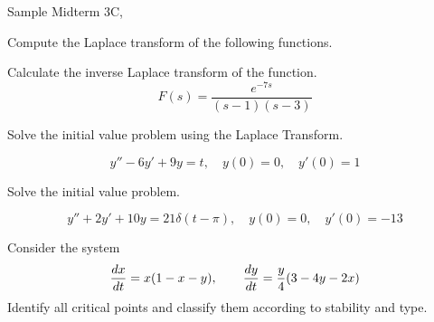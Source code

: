 \documentclass[12pt]{exam}
\newcommand{\TestName}{Sample Midterm 3C}
\begin{document}
    


\begin{center}
{\Large \TestName, \Course }
\end{center}

\begin{questions}



    \question[15] 
    Compute the Laplace transform of the following functions. 
    
    \question[5] %
    Calculate the inverse Laplace transform of the function. 
    $$F(s) = \frac{e^{-7s}}{(s-1)(s-3)}$$

    
    \question[10] Solve the initial value problem using the Laplace Transform. 
    
    $$y'' -6y' +9y = t, \quad y(0) =0, \quad y'(0) =1 $$
    
    \question[10] %
    Solve the initial value problem. 

    $$y'' + 2y' + 10y = 21\delta(t-\pi) , \quad y(0) = 0, \quad y'(0) = -13$$
        
    \question[10] 
    Consider the system $${\frac{dx}{dt}} = x(1-x-y), \qquad {\frac{dy}{dt}} = \frac y4 (3-4y -2x)$$
    Identify all critical points and classify them according to stability and type. 
\end{questions}
\end{document}
